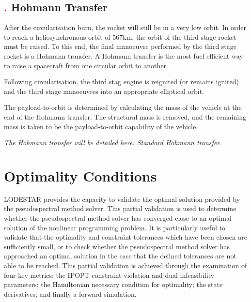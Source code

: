 \subsection{\textcolor{red}{.} Hohmann Transfer}

After the circularisation burn, the rocket will still be in a very low orbit. In order to reach a heliosynchronous orbit of 567km, the orbit of the third stage rocket must be raised. 
To this end, the final manoeuvre performed by the third stage rocket is a Hohmann transfer. A Hohmann transfer is the most fuel efficient way to raise a spacecraft from one circular orbit to another. 

Following circularisation, the third stag engine is reignited (or remains ignited) and the third stage manoeuvres into an appropriate elliptical orbit. 



The payload-to-orbit is determined by calculating the mass of the vehicle at the end of the Hohmann transfer. The structural mass is removed, and the remaining mass is taken to be the payload-to-orbit capability of the vehicle.

\textit{The Hohmann transfer will be detailed here. Standard Hohmann transfer.}



\section{Optimality Conditions}

LODESTAR provides the capacity to validate the optimal solution provided by the pseudospectral method solver. This partial validation is used to determine whether the pseudospectral method solver has converged close to an optimal solution of the nonlinear programming problem. It is particularly useful to validate that the optimality and constraint tolerances which have been chosen are sufficiently small, or to check whether the pseudospectral method solver has approached an optimal solution in the case that the defined tolerances are not able to be reached.   
This partial validation is achieved through the examination of four key metrics; the IPOPT constraint violation and dual infeasibility parameters; the Hamiltonian necessary condition for optimality; the state derivatives; and finally a forward simulation. 

